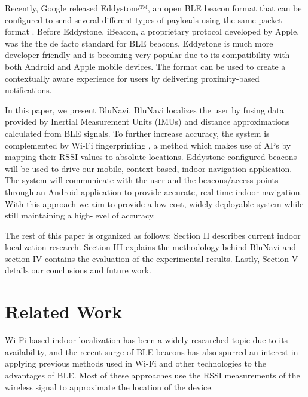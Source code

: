 \documentclass[conference]{IEEEtran}
\begin{document}
Recently, Google released Eddystone™, an open BLE beacon format that can be configured to send several different types of payloads using the same packet format \cite{Eddystone}. Before Eddystone, iBeacon, a proprietary protocol developed by Apple, was the the de facto standard for BLE beacons. Eddystone is much more developer friendly and is becoming very popular due to its compatibility with both Android and Apple mobile devices. The format can be used to create a contextually aware experience for users by delivering proximity-based notifications.

In this paper, we present BluNavi. BluNavi localizes the user by fusing data provided by Inertial Measurement Units (IMUs) and distance approximations calculated from BLE signals. To further increase accuracy, the system is complemented by Wi-Fi fingerprinting , a method which makes use of APs by mapping their RSSI values to absolute locations. Eddystone configured beacons will be used to drive our mobile, context based, indoor navigation application. The system will communicate with the user and the beacons/access points through an Android application to provide accurate, real-time indoor navigation. With this approach we aim to provide a low-cost, widely deployable system while still maintaining  a high-level of accuracy.

The rest of this paper is organized as follows: Section II describes current indoor localization research. Section III explains the methodology behind BluNavi and section IV contains the evaluation of the experimental results. Lastly, Section V details our conclusions and future work.


\section{Related Work}
Wi-Fi based indoor localization has been a widely researched topic due to its availability, and the recent surge of BLE beacons has also spurred an interest in applying previous methods used in Wi-Fi and other technologies to the advantages of BLE. Most of these approaches use the RSSI measurements of the wireless signal to approximate the location of the device.
\end{document}
